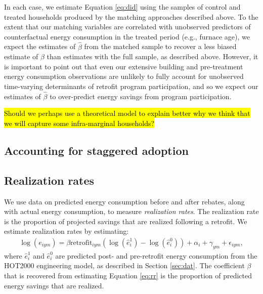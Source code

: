 \documentclass{article}
\newcommand{\hlc}[2][yellow]{ {\sethlcolor{#1} \hl{#2}} }
\begin{document}
In each case, we estimate Equation \eqref{eq:did} using the samples of control and treated households produced by the matching approaches described above. To the extent that our matching variables are correlated with unobserved predictors of counterfactual energy consumption in the treated period (e.g., furnace age), we expect the estimates of $\hat{\beta}$ from the matched sample to recover a less biased estimate of $\beta$ than estimates with the full sample, as described above. However, it is important to point out that even our extensive building and pre-treatment energy consumption observations are unlikely to fully account for unobserved time-varying determinants of retrofit program participation, and so we expect our estimates of $\hat{\beta}$ to over-predict energy savings from program participation.

\hlc{Should we perhaps use a theoretical model to explain better why we think that we will capture some infra-marginal households?}

\subsection{Accounting for staggered adoption}
 
\subsection{Realization rates}
We use data on predicted energy consumption before and after rebates, along with actual energy consumption, to measure \textit{realization rates}. The realization rate is the proportion of projected savings that are realized following a retrofit. We estimate realization rates by estimating:
\begin{align}
	\log(e_{iym}) = \beta \text{retrofit}_{iym} \left(\log(\hat{e}^1_i) - \log(\hat{e}^0_i) \right) + \alpha_i + \gamma_{ym} + \epsilon_{iym},
	\label{eq:rr}
\end{align} 
where $\hat{e}^1_i$ and $\hat{e}^0_i$ are predicted post- and pre-retrofit energy consumption from the HOT2000 engineering model, as described in Section \ref{sec:dat}. The coefficient $\beta$ that is recovered from estimating Equation \eqref{eq:rr} is the proportion of predicted energy savings that are realized.
\end{document}
